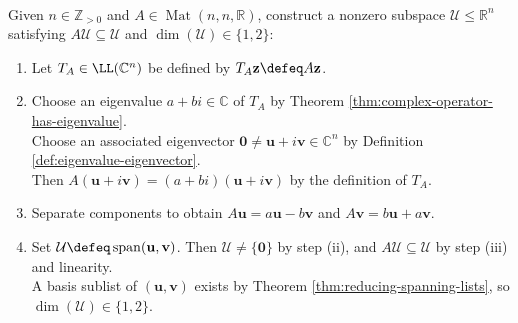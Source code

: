 \begin{computationmethod} \label{meth:complexify-real-matrix} \\
Given $n\in\mathbb{Z}_{>0}$ and $A\in\operatorname{Mat}(n,n,\mathbb{R})$, construct a nonzero subspace $\mathcal{U}\leq\mathbb{R}^n$ satisfying $A\mathcal{U}\subseteq\mathcal{U}$ and $\dim(\mathcal{U})\in\{1,2\}$:
\begin{enumerate}[label=(\roman*)]
\setlength{\itemsep}{0pt}
\item Let $T_A\in\LL(\mathbb{C}^n)$ be defined by $T_A\mathbf{z}\defeq A\mathbf{z}$.
\item Choose an eigenvalue $a+bi\in\mathbb{C}$ of $T_A$ by Theorem \ref{thm:complex-operator-has-eigenvalue}.\\
Choose an associated eigenvector $\mathbf{0}\neq\mathbf{u}+i\mathbf{v}\in\mathbb{C}^n$ by Definition \ref{def:eigenvalue-eigenvector}.\\
Then $A(\mathbf{u}+i\mathbf{v})=(a+bi)(\mathbf{u}+i\mathbf{v})$ by the definition of $T_A$.
\item Separate components to obtain $A\mathbf{u}=a\mathbf{u}-b\mathbf{v}$ and $A\mathbf{v}=b\mathbf{u}+a\mathbf{v}$.
\item Set $\mathcal{U}\defeq\operatorname{span}(\mathbf{u},\mathbf{v})$. Then $\mathcal{U}\neq\{\mathbf{0}\}$ by step (ii), and $A\mathcal{U}\subseteq\mathcal{U}$ by step (iii) and linearity.\\
A basis sublist of $(\mathbf{u},\mathbf{v})$ exists by Theorem \ref{thm:reducing-spanning-lists}, so $\dim(\mathcal{U})\in\{1,2\}$.
\end{enumerate}
\end{computationmethod}

